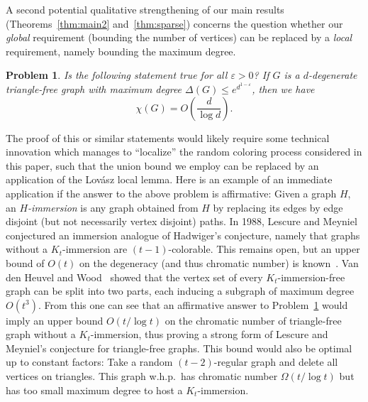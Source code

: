 \documentclass[10pt]{amsart}
\newtheorem{problem}[theorem]{Problem}
\theoremstyle{definition}
\begin{document}
A second potential qualitative strengthening of our main results (Theorems~\ref{thm:main2} and~\ref{thm:sparse}) concerns the question whether our \emph{global} requirement (bounding the number of vertices) can be replaced by a \emph{local} requirement, namely bounding the maximum degree.
\begin{problem}
\label{conj:max-degree}
Is the following statement true for all $\varepsilon>0$? If $G$ is a $d$-degenerate triangle-free graph with maximum degree $\Delta(G)\le e^{d^{1-\varepsilon}}$, then we have $$\chi(G) = O\left(\frac{d}{\log d}\right).$$
\end{problem}
The proof of this or similar statements would likely require some technical innovation which manages to ``localize'' the random coloring process considered in this paper, such that the union bound we employ can be replaced by an application of the Lov\'{a}sz local lemma. Here is an example of an immediate application if the answer to the above problem is affirmative: Given a graph $H$, an \emph{$H$-immersion} is any graph obtained from $H$ by replacing its edges by edge disjoint (but not necessarily vertex disjoint) paths. In 1988, Lescure and Meyniel~\cite{lescure} conjectured an immersion analogue of Hadwiger's conjecture, namely that graphs without a $K_t$-immersion are $(t-1)$-colorable. This remains open, but an upper bound of $O(t)$ on the degeneracy (and thus chromatic number) is known~\cite{devos}. Van den Heuvel and Wood~\cite{heuvelwood} showed that the vertex set of every $K_t$-immersion-free graph can be split into two parts, each inducing a subgraph of maximum degree $O(t^3)$. From this one can see that an affirmative answer to Problem~\ref{conj:max-degree} would imply an upper bound $O(t/\log t)$ on the chromatic number of triangle-free graph without a $K_t$-immersion, thus proving a strong form of Lescure and Meyniel's conjecture for triangle-free graphs. This bound would also be optimal up to constant factors: Take a random $(t-2)$-regular graph and delete all vertices on triangles. This graph w.h.p.~has chromatic number $\Omega(t/\log t)$ but has too small maximum degree to host a $K_t$-immersion. 
\end{document}
